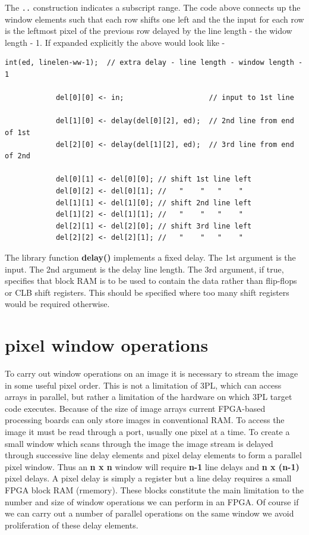         The \verb'..' construction indicates a subscript range. The code above
        connects up the window elements such that each row shifts one left and
        the the input for each row is the leftmost pixel of the previous row
        delayed by the line length - the widow length - 1. If expanded
        explicitly the above would look like -
        \begin{lstlisting}[gobble=8, language=threepl]
            int(ed, linelen-ww-1);  // extra delay - line length - window length - 1

            del[0][0] <- in;                    // input to 1st line

            del[1][0] <- delay(del[0][2], ed);  // 2nd line from end of 1st
            del[2][0] <- delay(del[1][2], ed);  // 3rd line from end of 2nd

            del[0][1] <- del[0][0]; // shift 1st line left
            del[0][2] <- del[0][1]; //   "    "   "    "
            del[1][1] <- del[1][0]; // shift 2nd line left
            del[1][2] <- del[1][1]; //   "    "   "    "
            del[2][1] <- del[2][0]; // shift 3rd line left
            del[2][2] <- del[2][1]; //   "    "   "    "
        \end{lstlisting}
        The library function {\bf delay()} implements a fixed delay. The 1st
        argument is the input. The 2nd argument is the delay line length. The
        3rd argument, if true, specifies that block RAM is to be used to contain
        the data rather than flip-flops or CLB shift registers. This should be
        specified where too many shift registers would be required otherwise.
        
        


    \section{pixel window operations}
    
        To carry out window operations on an image it is necessary to stream the
        image in some useful pixel order. This is not a limitation of 3PL,
        which can access arrays in parallel, but rather a limitation of the
        hardware on which 3PL target code executes. Because of the size of
        image arrays current FPGA-based processing boards can only store
        images in conventional RAM. To access the image it must be read
        through a port, usually one pixel at a time. To create a small window
        which scans through the image the image stream is delayed through
        successive line delay elements and pixel delay elements to form
        a parallel pixel window. Thus an {\bf n x n} window will require
        {\bf n-1} line delays and {\bf n x (n-1)} pixel delays. A pixel delay
        is simply a register but a line delay requires a small FPGA block RAM
        (rmemory). These blocks constitute the main limitation to the number
        and size of window operations we can perform in an FPGA. Of course
        if we can carry out a number of parallel operations on the same
        window we avoid proliferation of these delay elements.

